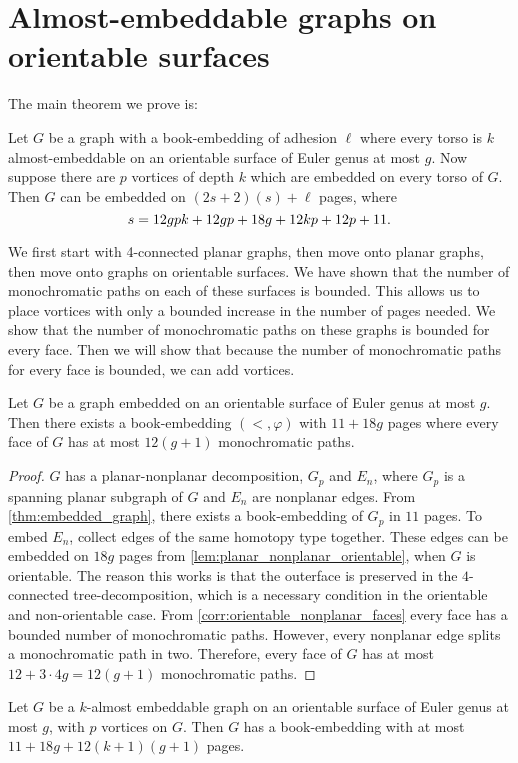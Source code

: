 \section{Almost-embeddable graphs on orientable surfaces}

The main theorem we prove is:
\begin{theorem}\label{thm:orientablevortices}
	Let $G$ be a graph with a book-embedding of adhesion $\ell$ where every torso is $k$ almost-embeddable on an orientable surface of Euler genus at most $g$. Now suppose there are $p$ vortices of depth $k$ which are embedded on every torso of $G$. Then $G$ can be embedded on $(2s + 2)(s) + \ell$ pages, where \[s = 12gpk + 12gp + 18g + 12kp + 12p + 11.\] 
\end{theorem}
We first start with 4-connected planar graphs, then move onto planar graphs, then move onto graphs on orientable surfaces. We have shown that the number of monochromatic paths on each of these surfaces is bounded. This allows us to place vortices with only a bounded increase in the number of pages needed. We show that the number of monochromatic paths on these graphs is bounded for every face. Then we will show that because the number of monochromatic paths for every face is bounded, we can add vortices.

\begin{lemma}\label{lem:orientablesurfaces_monochromatic_edges}
	Let $G$ be a graph embedded on an orientable surface of Euler genus at most $g$. Then there exists a book-embedding $(<, \varphi)$ with $11 + 18g$ pages where every face of $G$ has at most $12(g + 1)$ monochromatic paths.
\end{lemma}
\begin{proof}
	$G$ has a planar-nonplanar decomposition, $G_p$ and $E_n$, where $G_p$ is a spanning planar subgraph of $G$ and $E_n$ are nonplanar edges. From \cref{thm:embedded_graph}, there exists a book-embedding of $G_p$ in $11$ pages. To embed $E_n$, collect edges of the same homotopy type together. These edges can be embedded on $18g$ pages from \cref{lem:planar_nonplanar_orientable}, when $G$ is orientable. The reason this works is that the outerface is preserved in the $4$-connected tree-decomposition, which is a necessary condition in the orientable and non-orientable case.
	From \cref{corr:orientable_nonplanar_faces} every face has a bounded number of monochromatic paths. However, every nonplanar edge splits a monochromatic path in two. Therefore, every face of $G$ has at most $12 + 3 \cdot 4g = 12(g + 1)$ monochromatic paths.
\end{proof}
\begin{lemma}\label{lem:orientablesurfaces_almostembeddable}
	Let $G$ be a $k$-almost embeddable graph on an orientable surface of Euler genus at most $g$, with $p$ vortices on $G$. Then $G$ has a book-embedding with at most $11 + 18g + 12(k + 1)(g + 1)$ pages.
\end{lemma}

